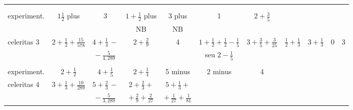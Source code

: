 {\begin{tabular}{ l c | c || c | c || c | c || c | c || c | c ||}
& 
& 
& 
\\
& & & & & & & & & & 
\\
experiment. 
& $ \displaystyle 1\frac{1}{2}$ plus 
& 3
& $ \displaystyle 1 + \frac{1}{2} $ plus 
& 3 plus 
& 1 
& $ \displaystyle 2 + \frac{3}{5} $ 
& 
& 
& 
& 
\\ 
& 
& 
& \hspace{7,5mm} NB 
& \hspace{7mm} NB 
& 
& 
& 
& 
& 
& 
\rule[-4pt]{0pt}{12pt}			
\\
\hline
%
%
celeritas 3 
\rule[0mm]{0mm}{6mm}
& $ \displaystyle 2 + \frac{1}{2} + \frac{15}{578} $ 
&\hspace{2,5mm}$ \displaystyle 4 + \frac{1}{4} \, -$ %
& $ \displaystyle 2 + \frac{2}{9} $ 
& 4
& $\displaystyle 1 \!+\! \frac{1}{2} \!+\! \frac{1}{2} \!-\! \frac{1}{5}$ 
& $ \displaystyle 3 + \frac{3}{5}+\frac{3}{25} $ 
& $ \displaystyle \frac{1}{2} + \frac{1}{3} $ 
& $ \displaystyle 3 + \frac{1}{3} $ 
& 0
& 3
\\
& 
& \hspace{-2,5mm}$ \displaystyle - \, \frac{5}{4,289} $ 
& 
& 
& seu $\displaystyle 2 - \frac{1}{5}$
& 
& 
& 
& 
& 
\\
& & & & & & & & & & 
\\
%
experiment.
& $ \displaystyle 2 + \frac{1}{2}$ 
& $ \displaystyle 4 + \frac{1}{5} $ 
& $ \displaystyle 2 + \frac{1}{4} $ 
& 5 minus 
& 2 minus 
& 4 
& 
& 
& 
& 
\rule[-4mm]{0mm}{0mm}
\\
\hline
%
%
celeritas 4 
\rule[0mm]{0mm}{6mm}
& $ \displaystyle 3 + \frac{1}{3} + \frac{10}{289} $ 
& \hspace{2,5mm} $ \displaystyle 5 + \frac{2}{3} \, - $ %
& $ \displaystyle 2 + \frac{2}{3} + $ 
& $ \displaystyle 5 + \frac{1}{3} + $ 
& 
& 
& 
& 
& 
& 
\\
& 
& $ \displaystyle - \, \frac{5}{3,289} $
& $ \displaystyle + \, \frac{2}{9} + \frac{2}{27} $ 
& \hspace{-2,5mm} $ \displaystyle + \, \frac{1}{27} + \frac{1}{81} $ 
&
&
&
&
&
& 
\end{tabular}
}%
\protect{}%
\protect{}%
\protect{}%
